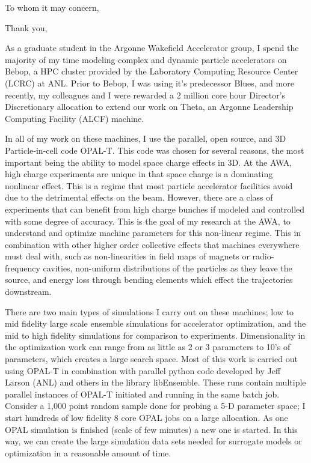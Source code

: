 \documentclass[11pt,a4paper,sans]{moderncv}        %
\begin{document}
\date{March 15, 2018}
\opening{To whom it may concern,}
\closing{Thank you,}

\makelettertitle

As a graduate student in the Argonne Wakefield Accelerator group, 
I spend the majority of my time modeling complex and dynamic particle accelerators on 
Bebop, a HPC cluster provided by the Laboratory Computing Resource Center (LCRC) at ANL. 
Prior to Bebop, I was using it's predecessor Blues, and more recently, 
my colleagues and I were rewarded a 2 million core hour Director's Discretionary 
allocation to extend our work on Theta, 
an Argonne Leadership Computing Facility (ALCF) machine. 

In all of my work on these machines, I use the parallel, open source, and 
3D Particle-in-cell code OPAL-T. 
This code was chosen for several reasons, the most important being the ability 
to model space charge effects in 3D. At the AWA, high charge experiments are unique
in that space charge is a dominating nonlinear effect. This is a regime that most 
particle accelerator facilities avoid due to the detrimental effects on the beam.
However, there are a class of experiments that can benefit from high charge bunches 
if modeled and controlled with some degree of accuracy. This is the goal of my research
at the AWA, to understand and optimize machine parameters for 
this non-linear regime. This in combination with other higher order collective 
effects that machines everywhere must deal with, such as non-linearities in field maps of 
magnets or radio-frequency cavities, non-uniform distributions of the particles as they 
leave the source, and energy loss through bending elements which effect the trajectories downstream. 

There are two main types of simulations I carry out on these machines; 
low to mid fidelity large scale ensemble simulations for accelerator optimization,
and the mid to high fidelity simulations for comparison to experiments. 
Dimensionality in the optimization work can range from as little as 2 or 3 parameters 
to 10's of parameters, which creates a large search space. Most of this work is carried
out using OPAL-T in combination with parallel python code developed by Jeff Larson (ANL) 
and others in the library libEnsemble. These runs contain multiple parallel instances of OPAL-T initiated and running in the same batch job. Consider a 1,000 point random sample done for probing a 5-D parameter space; I start hundreds of low fidelity 8 core OPAL jobs on a large allocation.
As one OPAL simulation is finished (scale of few minutes) a new one is started.
In this way, we can create the large simulation data sets needed for surrogate models or optimization in a reasonable amount of time. 
\end{document}
